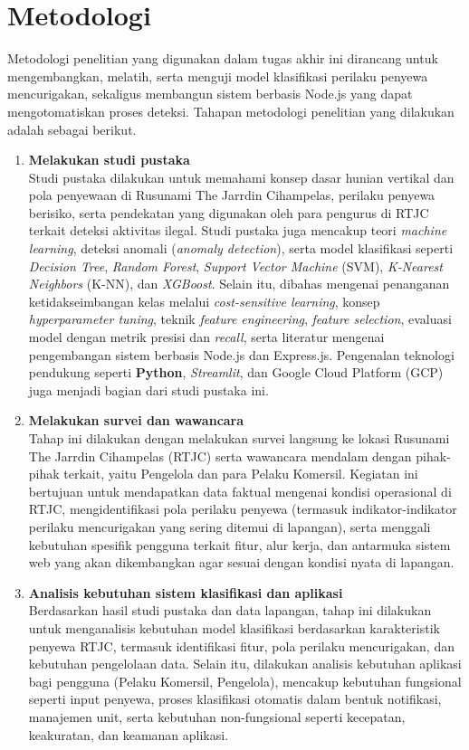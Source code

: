 \section{Metodologi}
\label{sec:metlit}
Metodologi penelitian yang digunakan dalam tugas akhir ini dirancang untuk mengembangkan, melatih, serta menguji model klasifikasi perilaku penyewa mencurigakan, sekaligus membangun sistem berbasis Node.js yang dapat mengotomatiskan proses deteksi. Tahapan metodologi penelitian yang dilakukan adalah sebagai berikut.

\begin{enumerate}
    \item \textbf{{Melakukan studi pustaka}} \\
    Studi pustaka dilakukan untuk memahami konsep dasar hunian vertikal dan pola penyewaan di Rusunami The Jarrdin Cihampelas, perilaku penyewa berisiko, serta pendekatan yang digunakan oleh para pengurus di RTJC terkait deteksi aktivitas ilegal. Studi pustaka juga mencakup teori \textit{machine learning}, deteksi anomali (\textit{anomaly detection}), serta model klasifikasi seperti \textit{Decision Tree}, \textit{Random Forest}, \textit{Support Vector Machine} ({SVM}), \textit{K-Nearest Neighbors} ({K-NN}), dan \textit{XGBoost}. Selain itu, dibahas mengenai penanganan ketidakseimbangan kelas melalui \textit{cost-sensitive learning}, konsep \textit{hyperparameter tuning}, teknik \textit{feature engineering}, \textit{feature selection}, evaluasi model dengan metrik presisi dan \textit{recall}, serta literatur mengenai pengembangan sistem berbasis Node.js dan Express.js. Pengenalan teknologi pendukung seperti \textbf{Python}, \textit{Streamlit}, dan Google Cloud Platform (GCP) juga menjadi bagian dari studi pustaka ini.
    
    \item \textbf{{Melakukan survei dan wawancara}} \\
    Tahap ini dilakukan dengan melakukan survei langsung ke lokasi Rusunami The Jarrdin Cihampelas (RTJC) serta wawancara mendalam dengan pihak-pihak terkait, yaitu Pengelola dan para Pelaku Komersil. Kegiatan ini bertujuan untuk mendapatkan data faktual mengenai kondisi operasional di RTJC, mengidentifikasi pola perilaku penyewa (termasuk indikator-indikator perilaku mencurigakan yang sering ditemui di lapangan), serta menggali kebutuhan spesifik pengguna terkait fitur, alur kerja, dan antarmuka sistem web yang akan dikembangkan agar sesuai dengan kondisi nyata di lapangan.
    
    \item \textbf{{Analisis kebutuhan sistem klasifikasi dan aplikasi}} \\
    Berdasarkan hasil studi pustaka dan data lapangan, tahap ini dilakukan untuk menganalisis kebutuhan model klasifikasi berdasarkan karakteristik penyewa RTJC, termasuk identifikasi fitur, pola perilaku mencurigakan, dan kebutuhan pengelolaan data. Selain itu, dilakukan analisis kebutuhan aplikasi bagi pengguna (Pelaku Komersil, Pengelola), mencakup kebutuhan fungsional seperti input penyewa, proses klasifikasi otomatis dalam bentuk notifikasi, manajemen unit, serta kebutuhan non-fungsional seperti kecepatan, keakuratan, dan keamanan aplikasi.
    

\end{enumerate}
